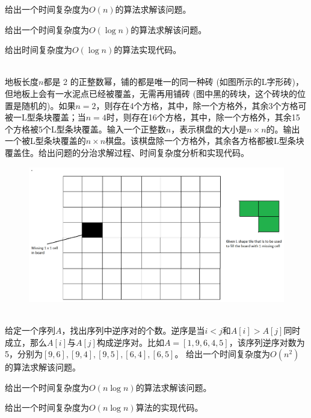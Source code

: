 \documentclass[12pt,twoside]{article}
\begin{document}
\begin{problems}
\bparts
\ppart 给出一个时间复杂度为$O(n)$的算法求解该问题。

\ppart 给出一个时间复杂度为$O(\log n)$的算法求解该问题。


\ppart 给出时间复杂度为$O(\log n)$的算法实现代码。

\eparts



\newpage
{} \\
地板长度$n$都是 2 的正整数幂，铺的都是唯一的同一种砖 (如图所示的L字形砖)， 但地板上会有一水泥点已经被覆盖，无需再用铺砖 (图中黑的砖块，这个砖块的位置是随机的)。如果$n=2$，则存在4个方格，其中，除一个方格外，其余3个方格可被一L型条块覆盖；当$n=4$时，则存在16个方格，其中，除一个方格外，其余15个方格被5个L型条块覆盖。输入一个正整数$n$，表示棋盘的大小是$n\times n$的。输出一个被L型条块覆盖的$n\times n$棋盘。该棋盘除一个方格外，其余各方格都被L型条块覆盖住。给出问题的分治求解过程、时间复杂度分析和实现代码。
\begin{figure}[h]
   \centering
   \includegraphics[scale=0.15]{fig/tiles.png}
\end{figure}

\newpage
{} \\
给定一个序列$A$，找出序列中逆序对的个数。逆序是当$i<j$和$A[i]>A[j]$同时成立，那么$A[i]$与$A[j]$构成逆序对。比如$A=[1, 9, 6, 4, 5]$，该序列逆序对数为5，分别为$[9, 6], [9, 4], [9, 5], [6, 4], [6, 5]$。
\bparts
\ppart 给出一个时间复杂度为$O(n^2)$的算法求解该问题。

\ppart 给出一个时间复杂度为$O(n\log n)$的算法求解该问题。

\ppart 给出一个时间复杂度为$O(n\log n)$算法的实现代码。


\eparts
\end{problems}
\end{document}
